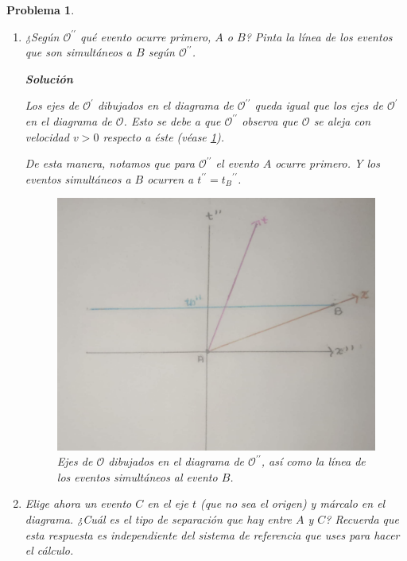 \documentclass[12pt]{article}
\theoremstyle{break}
\newtheorem{exercise}{Problema}
\theoremstyle{nonumberbreak}
\newcommand*{\observer}{\mathcal{O}}
\newcommand*{\primeobserver}{\mathcal{O}^{\prime}}
\newcommand*{\biprimeobserver}{\mathcal{O}^{\prime\prime}}
\newcommand*{\inlinesol}{\vspace*{10pt}\textbf{Solución}\vspace*{10pt}}
\begin{document}
\begin{exercise}
\begin{enumerate}[label = \alph*)]
            \pagebreak
            \item ¿Según \(\biprimeobserver\) qué evento ocurre primero, \(A\) o \(B\)? Pinta la línea de los eventos que son simultáneos a \(B\) según \(\biprimeobserver\).
            
            \inlinesol

            Los ejes de \(\primeobserver\) dibujados en el diagrama de \(\biprimeobserver\) queda igual que los ejes de \(\primeobserver\) en el diagrama de \(\observer\). Esto se debe a que \(\biprimeobserver\) observa que \(\observer\) se aleja con velocidad \(v > 0\) respecto a éste (véase \cref{fig:OInOPrimePrime}).
            
            De esta manera, notamos que para \(\biprimeobserver\) el evento \(A\) ocurre primero. Y los eventos simultáneos a \(B\) ocurren a \(t^{\prime\prime} = {t_{B}}^{\prime\prime}\).

            \begin{figure}[htb]
                \centering
                \includegraphics[scale = 0.15]{fig-2.4.pdf}
                \caption{Ejes de \(\observer\) dibujados en el diagrama de \(\biprimeobserver\), así como la línea de los eventos simultáneos al evento \(B\).}
                \label{fig:OInOPrimePrime}
            \end{figure}

            \pagebreak
            \item Elige ahora un evento \(C\) en el eje \(t\) (que no sea el origen) y márcalo en el diagrama. ¿Cuál es el tipo de separación que hay entre \(A\) y \(C\)? Recuerda que esta respuesta es independiente del sistema de referencia que uses para hacer el cálculo.
            

\end{enumerate}
\end{exercise}
\end{document}
